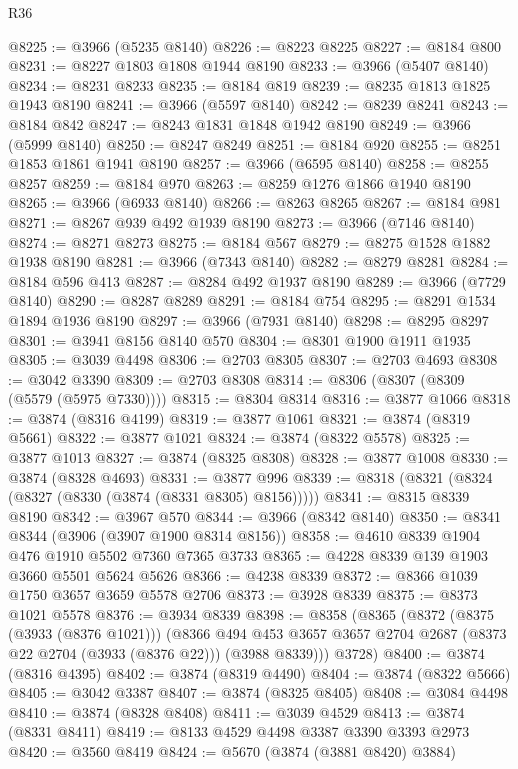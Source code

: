 \begin{lexlean}{R36}
\begin{coremodule}
@8225 := @3966 (@5235 @8140)
@8226 := @8223 @8225
@8227 := @8184 @800
@8231 := @8227 @1803 @1808 @1944 @8190
@8233 := @3966 (@5407 @8140)
@8234 := @8231 @8233
@8235 := @8184 @819
@8239 := @8235 @1813 @1825 @1943 @8190
@8241 := @3966 (@5597 @8140)
@8242 := @8239 @8241
@8243 := @8184 @842
@8247 := @8243 @1831 @1848 @1942 @8190
@8249 := @3966 (@5999 @8140)
@8250 := @8247 @8249
@8251 := @8184 @920
@8255 := @8251 @1853 @1861 @1941 @8190
@8257 := @3966 (@6595 @8140)
@8258 := @8255 @8257
@8259 := @8184 @970
@8263 := @8259 @1276 @1866 @1940 @8190
@8265 := @3966 (@6933 @8140)
@8266 := @8263 @8265
@8267 := @8184 @981
@8271 := @8267 @939 @492 @1939 @8190
@8273 := @3966 (@7146 @8140)
@8274 := @8271 @8273
@8275 := @8184 @567
@8279 := @8275 @1528 @1882 @1938 @8190
@8281 := @3966 (@7343 @8140)
@8282 := @8279 @8281
@8284 := @8184 @596 @413
@8287 := @8284 @492 @1937 @8190
@8289 := @3966 (@7729 @8140)
@8290 := @8287 @8289
@8291 := @8184 @754
@8295 := @8291 @1534 @1894 @1936 @8190
@8297 := @3966 (@7931 @8140)
@8298 := @8295 @8297
@8301 := @3941 @8156 @8140 @570
@8304 := @8301 @1900 @1911 @1935
@8305 := @3039 @4498
@8306 := @2703 @8305
@8307 := @2703 @4693
@8308 := @3042 @3390
@8309 := @2703 @8308
@8314 := @8306 (@8307 (@8309 (@5579 (@5975 @7330))))
@8315 := @8304 @8314
@8316 := @3877 @1066
@8318 := @3874 (@8316 @4199)
@8319 := @3877 @1061
@8321 := @3874 (@8319 @5661)
@8322 := @3877 @1021
@8324 := @3874 (@8322 @5578)
@8325 := @3877 @1013
@8327 := @3874 (@8325 @8308)
@8328 := @3877 @1008
@8330 := @3874 (@8328 @4693)
@8331 := @3877 @996
@8339 := @8318 (@8321 (@8324 (@8327 (@8330 (@3874 (@8331 @8305) @8156)))))
@8341 := @8315 @8339 @8190
@8342 := @3967 @570
@8344 := @3966 (@8342 @8140)
@8350 := @8341 @8344 (@3906 (@3907 @1900 @8314 @8156))
@8358 := @4610 @8339 @1904 @476 @1910 @5502 @7360 @7365 @3733
@8365 := @4228 @8339 @139 @1903 @3660 @5501 @5624 @5626
@8366 := @4238 @8339
@8372 := @8366 @1039 @1750 @3657 @3659 @5578 @2706
@8373 := @3928 @8339
@8375 := @8373 @1021 @5578
@8376 := @3934 @8339
@8398 := @8358
    (@8365
      (@8372
        (@8375 (@3933 (@8376 @1021)))
        (@8366
          @494
          @453
          @3657
          @3657
          @2704
          @2687
          (@8373 @22 @2704 (@3933 (@8376 @22)))
          (@3988 @8339)))
      @3728)
@8400 := @3874 (@8316 @4395)
@8402 := @3874 (@8319 @4490)
@8404 := @3874 (@8322 @5666)
@8405 := @3042 @3387
@8407 := @3874 (@8325 @8405)
@8408 := @3084 @4498
@8410 := @3874 (@8328 @8408)
@8411 := @3039 @4529
@8413 := @3874 (@8331 @8411)
@8419 := @8133 @4529 @4498 @3387 @3390 @3393 @2973
@8420 := @3560 @8419
@8424 := @5670 (@3874 (@3881 @8420) @3884)

\end{coremodule}
\end{lexlean}
